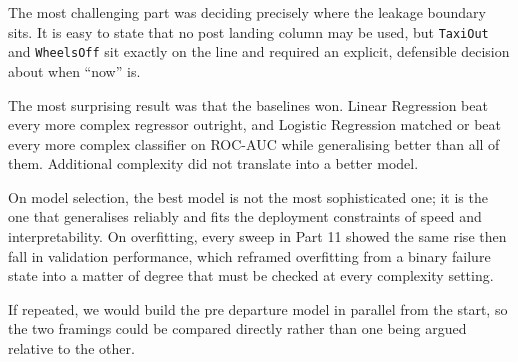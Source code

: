 \documentclass[11pt,a4paper]{article}
\begin{document}
The most challenging part was deciding precisely where the leakage boundary sits. It is
easy to state that no post landing column may be used, but \texttt{TaxiOut} and
\texttt{WheelsOff} sit exactly on the line and required an explicit, defensible decision
about when ``now'' is.

The most surprising result was that the baselines won. Linear Regression beat every more
complex regressor outright, and Logistic Regression matched or beat every more complex
classifier on ROC-AUC while generalising better than all of them. Additional complexity
did not translate into a better model.

On model selection, the best model is not the most sophisticated one; it is the one that
generalises reliably and fits the deployment constraints of speed and interpretability.
On overfitting, every sweep in Part 11 showed the same rise then fall in validation
performance, which reframed overfitting from a binary failure state into a matter of
degree that must be checked at every complexity setting.

If repeated, we would build the pre departure model in parallel from the start, so the
two framings could be compared directly rather than one being argued relative to the
other.
\end{document}
